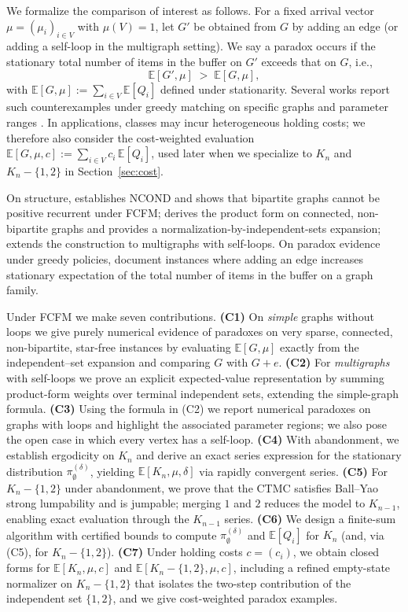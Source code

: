 \documentclass[11pt]{article}
\begin{document}
We formalize the comparison of interest as follows. For a fixed arrival vector $\mu=(\mu_i)_{i\in V}$ with $\mu(V)=1$, let $G'$ be obtained from $G$ by adding an edge (or adding a self-loop in the multigraph setting). We say a paradox occurs if the stationary total number of items in the buffer on $G'$ exceeds that on $G$, i.e.,
\[
\mathbb{E}[G',\mu]\;>\;\mathbb{E}[G,\mu],
\]
with $\mathbb{E}[G,\mu]:=\sum_{i\in V}\mathbb{E}[Q_i]$ defined under stationarity. Several works report such counterexamples under greedy matching on specific graphs and parameter ranges \cite{CDFB21,BCDF24}. In applications, classes may incur heterogeneous holding costs; we therefore also consider the cost-weighted evaluation $\mathbb{E}[G,\mu,c]:=\sum_{i\in V}c_i\,\mathbb{E}[Q_i]$, used later when we specialize to $K_n$ and $K_n-\{1,2\}$ in Section~\ref{sec:cost}.

On structure, \cite{MaMo18} establishes \textsc{NCOND} and shows that bipartite graphs cannot be positive recurrent under FCFM; \cite{MBMa21} derives the product form on connected, non-bipartite graphs and provides a normalization-by-independent-sets expansion; \cite{BMMR20} extends the construction to multigraphs with self-loops. On paradox evidence under greedy policies, \cite{CDFB21,BCDF24} document instances where adding an edge increases stationary expectation of the total number of items in the buffer on a graph family. 

Under \textsc{FCFM} we make seven contributions. \textbf{(C1)} On \emph{simple} graphs without loops we give purely numerical evidence of paradoxes on very sparse, connected, non-bipartite, star-free instances by evaluating \(\mathbb{E}[G,\mu]\) exactly from the independent–set expansion and comparing \(G\) with \(G+e\). \textbf{(C2)} For \emph{multigraphs} with self-loops we prove an explicit expected-value representation by summing product-form weights over terminal independent sets, extending the simple-graph formula. \textbf{(C3)} Using the formula in (C2) we report numerical paradoxes on graphs with loops and highlight the associated parameter regions; we also pose the open case in which every vertex has a self-loop. \textbf{(C4)} With abandonment, we establish ergodicity on \(K_n\) and derive an exact series expression for the stationary distribution \(\pi_{\emptyset}^{(\delta)}\), yielding \(\mathbb{E}[K_n,\mu,\delta]\) via rapidly convergent series. \textbf{(C5)} For \(K_n-\{1,2\}\) under abandonment, we prove that the CTMC satisfies Ball–Yao strong lumpability and is jumpable; merging \(1\) and \(2\) reduces the model to \(K_{n-1}\), enabling exact evaluation through the \(K_{n-1}\) series. \textbf{(C6)} We design a finite-sum algorithm with certified bounds to compute \(\pi_{\emptyset}^{(\delta)}\) and \(\mathbb{E}[Q_i]\) for \(K_n\) (and, via (C5), for \(K_n-\{1,2\}\)). \textbf{(C7)} Under holding costs \(c=(c_i)\), we obtain closed forms for \(\mathbb{E}[K_n,\mu,c]\) and \(\mathbb{E}[K_n-\{1,2\},\mu,c]\), including a refined empty-state normalizer on \(K_n-\{1,2\}\) that isolates the two-step contribution of the independent set \(\{1,2\}\), and we give cost-weighted paradox examples. 
\end{document}
